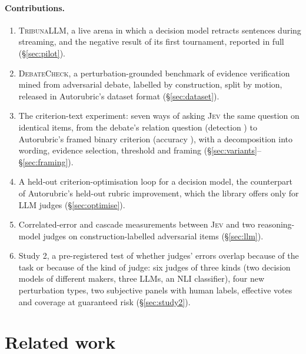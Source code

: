 \documentclass[11pt,a4paper]{article}
\newcommand{\jev}{\textsc{Jev}}
\newcommand{\dc}{\textsc{DebateCheck}}
\newcommand{\tribuna}{\textsc{TribunaLLM}}
\begin{document}
\paragraph{Contributions.}
\begin{enumerate}[nosep,leftmargin=1.4em]
\item \tribuna{}, a live arena in which a decision model retracts sentences during streaming, and the negative result of its first tournament, reported in full (\S\ref{sec:pilot}).
\item \dc{}, a perturbation-grounded benchmark of evidence verification mined from adversarial debate, labelled by construction, split by motion, released in Autorubric's dataset format (\S\ref{sec:dataset}).
\item The criterion-text experiment: seven ways of asking \jev{} the same question on identical items, from the debate's relation question (detection \detLooseTwoZero{}) to Autorubric's framed binary criterion (accuracy \arAllJevchoiceAcc{}), with a decomposition into wording, evidence selection, threshold and framing (\S\ref{sec:variants}--\S\ref{sec:framing}).
\item A held-out criterion-optimisation loop for a decision model, the counterpart of Autorubric's held-out rubric improvement, which the library offers only for LLM judges (\S\ref{sec:optimise}).
\item Correlated-error and cascade measurements between \jev{} and two reasoning-model judges on construction-labelled adversarial items (\S\ref{sec:llm}).
\item Study 2, a pre-registered test of whether judges' errors overlap because of the task or because of the kind of judge: six judges of three kinds (two decision models of different makers, three LLMs, an NLI classifier), four new perturbation types, two subjective panels with human labels, effective votes and coverage at guaranteed risk (\S\ref{sec:study2}).
\end{enumerate}

\section{Related work}
\end{document}
